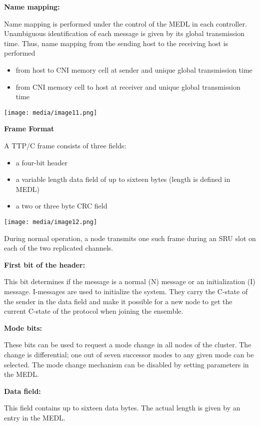 \textbf{Name mapping:}

Name mapping is performed under the control of the MEDL in each
controller. Unambiguous identification of each message is given by its
global transmission time. Thus, name mapping from the sending host to
the receiving host is performed

\begin{itemize}
\item
  from host to CNI memory cell at sender and unique global transmission
  time
\item
  from CNI memory cell to host at receiver and unique global
  transmission time
\end{itemize}

\texttt{[image: media/image11.png]}

\textbf{Frame Format}

A TTP/C frame consists of three fields:

\begin{itemize}
\item
  a four-bit header
\item
  a variable length data field of up to sixteen bytes (length is defined
  in MEDL)
\item
  a two or three byte CRC field
\end{itemize}

\texttt{[image: media/image12.png]}

During normal operation, a node transmits one such frame during an SRU
slot on each of the two replicated channels.

\textbf{First bit of the header:}

This bit determines if the message is a normal (N) message or an
initialization (I) message. I-messages are used to initialize the
system. They carry the C-state of the sender in the data field and make
it possible for a new node to get the current C-state of the protocol
when joining the ensemble.

\textbf{Mode bits:}

These bits can be used to request a mode change in all nodes of the
cluster. The change is differential; one out of seven successor modes to
any given mode can be selected. The mode change mechanism can be
disabled by setting parameters in the MEDL.

\textbf{Data field:}

This field contains up to sixteen data bytes. The actual length is given
by an entry in the MEDL.

